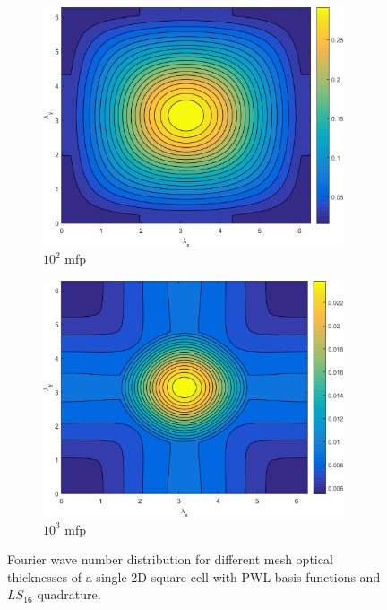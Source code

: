 \begin{figure}
{\begin{subfigure}[b]{0.485\textwidth}
		\centering
		\includegraphics[width=0.975\textwidth]{figures/appendices/SI_M4S_UPWLD1_LS16_x=100_dydx=1_contour.png}
		\caption{$10^{2}$ mfp}
	\end{subfigure}
	\hfill
	\begin{subfigure}[b]{0.485\textwidth}
		\centering
		\includegraphics[width=0.975\textwidth]{figures/appendices/SI_M4S_UPWLD1_LS16_x=1000_dydx=1_contour.png}
		\caption{$10^{3}$ mfp}
	\end{subfigure}
	}
\caption{Fourier wave number distribution for different mesh optical thicknesses of a single 2D square cell with PWL basis functions and $LS_{16}$ quadrature.}
\label{fig::App_DSA_M4S_LS16}
\end{figure}

